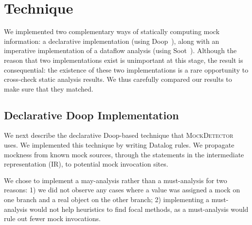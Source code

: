 \section{Technique}
\label{sec:technique}

We implemented two complementary ways of statically computing mock information: 
a declarative implementation (using Doop~\cite{bravenboer09:_stric_declar_specif_sophis_point_analy}), along with
an imperative implementation of a dataflow analysis (using Soot~\cite{Vallee-Rai:1999:SJB:781995.782008}). 
Although the reason that two implementations exist is unimportant at this stage, the result is consequential: the existence of these two implementations is a rare opportunity to cross-check static analysis results. We thus carefully compared our results to make sure that they matched.

\subsection{Declarative Doop Implementation}
\label{sec:dec-doop}
We next describe the declarative Doop-based technique that \textsc{MockDetector} uses. We implemented this technique by writing Datalog rules. We propagate mockness from known mock sources, through the statements in the intermediate representation (IR), to potential mock invocation sites. 

We chose to implement a may-analysis rather than a must-analysis for two reasons: 1) we did not observe any cases where a value was assigned a mock on one branch and a real object on the other branch; 2) implementing a must-analysis would not help heuristics to find focal methods, as a must-analysis would rule out fewer mock invocations. 

